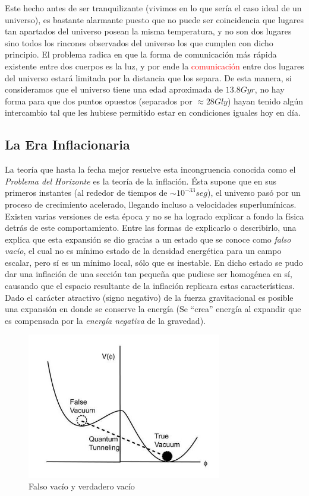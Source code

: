 Este hecho antes de ser tranquilizante (vivimos en lo que sería el caso ideal de un universo), es bastante alarmante puesto que no puede ser coincidencia que lugares tan apartados del universo posean la misma temperatura, y no son dos lugares sino todos los rincones observados del universo los que cumplen con dicho principio. El problema radica en que la forma de comunicación más rápida existente entre dos cuerpos es la luz, y por ende la \textcolor{red}{comunicación} entre dos lugares del universo estará limitada por la distancia que los separa. De esta manera, si consideramos que el universo tiene una edad aproximada de $13.8Gyr$, no hay forma para que dos puntos opuestos (separados por $\approx 28Gly$) hayan tenido algún intercambio tal que les hubiese permitido estar en condiciones iguales hoy en día. 


\subsection{La Era Inflacionaria}
\label{sub:infl}
La teoría que hasta la fecha mejor resuelve esta incongruencia conocida como el \textit{Problema del Horizonte} es la teoría de la inflación. Ésta supone que en sus primeros instantes (al rededor de tiempos de $\sim 10^{-33} seg$), el universo pasó por un proceso de crecimiento acelerado, llegando incluso a velocidades superlumínicas. Existen varias versiones de esta época y no se ha logrado explicar a fondo la física detrás de este comportamiento. Entre las formas de explicarlo o describirlo, una explica que esta expansión se dio gracias a un estado que se conoce como \textit{falso vacío}, el cual no es mínimo estado de la densidad energética para un campo escalar, pero sí es un mínimo local, sólo que es inestable. En dicho estado se pudo dar una inflación de una sección tan pequeña que pudiese ser homogénea en sí, causando que el espacio resultante de la inflación replicara estas características. Dado el carácter atractivo (signo negativo) de la fuerza gravitacional es posible una expansión en donde se conserve la energía (Se ``crea'' energía al expandir que es compensada por la \textit{energía negativa} de la gravedad)\cite{bang}. 

\begin{figure}[H]
	\centering
	\includegraphics[width=8.5cm]{MarcoTeorico/figure7}
	\caption[Falso vacío y verdadero vacío ]{Falso vacío y verdadero vacío \footnotemark}
	\label{fig:falsevac}
\end{figure}

